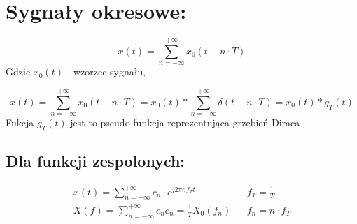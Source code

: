 \section{Sygnały okresowe:}
    \begin{equation*}
        x(t) = \sum_{n = -\infty}^{+\infty}x_0(t-n\cdot T)
    \end{equation*}
    Gdzie $x_0(t)$ - wzorzec sygnału,

    \begin{equation*}
        x(t) = \sum_{n=-\infty}^{+\infty}x_0(t-n\cdot T) = x_0(t) * \sum_{n=-\infty}^{+\infty}\delta(t-n\cdot T) = x_0(t)*g_T(t)
    \end{equation*}
    Fukcja $g_T(t)$ jest to pseudo funkcja reprezentująca grzebień Diraca

    \subsection*{Dla funkcji zespolonych:}
        \begin{align*}
            x(t) = \sum_{n=-\infty}^{+\infty} c_n \cdot e^{j2\pi n f_T t} && f_T = \frac{1}{T}\\
            X(f) = \sum_{n=-\infty}^{+\infty} c_n 
            c_n = \frac{1}{T} X_0(f_n) && f_n = n\cdot f_T
        \end{align*}